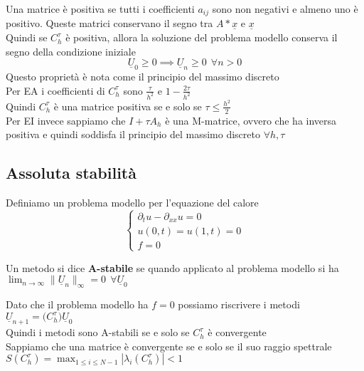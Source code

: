 \documentclass{article}
\renewcommand{\vv}[1]{\underline{#1}}
\begin{document}
Una matrice è positiva se tutti i coefficienti $a_{ij}$ sono non negativi e almeno uno è positivo. Queste matrici conservano il segno tra $A*\vv{x}$ e $\vv{x}$\\

Quindi se $C_h^{\tau}$ è positiva, allora la soluzione del problema modello conserva il segno della condizione iniziale
\[
\vv{U}_0\ge0 \implies \vv{U}_n\ge 0 \ \ \forall n>0
\]
Questo proprietà è nota come il principio del massimo discreto\\

Per EA i coefficienti di $C_h^{\tau}$ sono $\frac{\tau}{h^2}$ e $1-\frac{2\tau}{h^2}$\\
Quindi $C_h^{\tau}$ è una matrice positiva se e solo se $\tau\le \frac{h^2}{2}$\\

Per EI invece sappiamo che $I+\tau A_h$ è una M-matrice, ovvero che ha inversa positiva e quindi soddisfa il principio del massimo discreto $\forall  h, \tau$\\


\subsection{Assoluta stabilità}

Definiamo un problema modello per l'equazione del calore
\[
\begin{cases}
    \partial_t u -\partial_{xx} u = 0\\
    u(0,t)=u(1,t)=0\\
    f=0
\end{cases}
\]

\begin{defi}
    Un metodo si dice \textbf{A-stabile} se quando applicato al problema modello si ha $\displaystyle\lim_{n\to\infty} \|\vv{U}_n\|_{\infty}=0 \ \ \forall \vv{U}_0$ 
\end{defi}

\phantom{}

Dato che il problema modello ha $f=0$ possiamo riscrivere i metodi \ $\vv{U}_{n+1}=\big(C_h^{\tau}\big)\vv{U}_0$\\

Quindi i metodi sono A-stabili se e solo se $C_h^{\tau}$ è convergente\\

Sappiamo che una matrice è convergente se e solo se il suo raggio spettrale $S(C_h^{\tau})=\displaystyle\max_{1\le i\le N-1} |\lambda_i(C_h^{\tau})| < 1$\\
\end{document}
